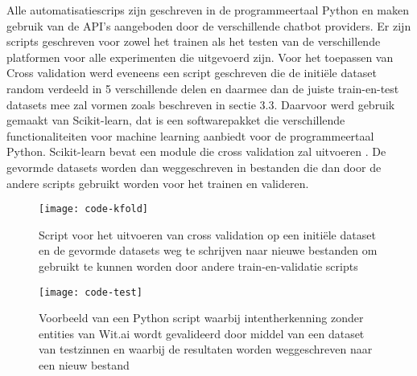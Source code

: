 Alle automatisatiescrips zijn geschreven in de programmeertaal Python en maken gebruik van de API’s aangeboden door de verschillende chatbot providers. Er zijn scripts geschreven voor zowel het trainen als het testen van de verschillende platformen voor alle experimenten die uitgevoerd zijn. Voor het toepassen van Cross validation werd eveneens een script geschreven die de initiële dataset random verdeeld in 5 verschillende delen en daarmee dan de juiste train-en-test datasets mee zal vormen zoals beschreven in sectie 3.3. Daarvoor werd gebruik gemaakt van Scikit-learn, dat is een softwarepakket die verschillende functionaliteiten voor machine learning aanbiedt voor de programmeertaal Python. Scikit-learn bevat een module die cross validation zal uitvoeren \autocite{sklearn2020}. De gevormde datasets worden dan weggeschreven in bestanden die dan door de andere scripts gebruikt worden voor het trainen en valideren.

\begin{figure}[H]
    \label{fig:code-kfold}
    \centering
    \texttt{[image: code-kfold]}
    \caption{Script voor het uitvoeren van cross validation op een initiële dataset en de gevormde datasets weg te schrijven naar nieuwe bestanden om gebruikt te kunnen worden door andere train-en-validatie scripts}
\end{figure}

\begin{figure}[H]
    \label{fig:code-validatie}
    \centering
    \texttt{[image: code-test]}
    \caption{Voorbeeld van een Python script waarbij intentherkenning zonder entities van Wit.ai wordt gevalideerd door middel van een dataset van testzinnen en waarbij de resultaten worden weggeschreven naar een nieuw bestand}
\end{figure}

























